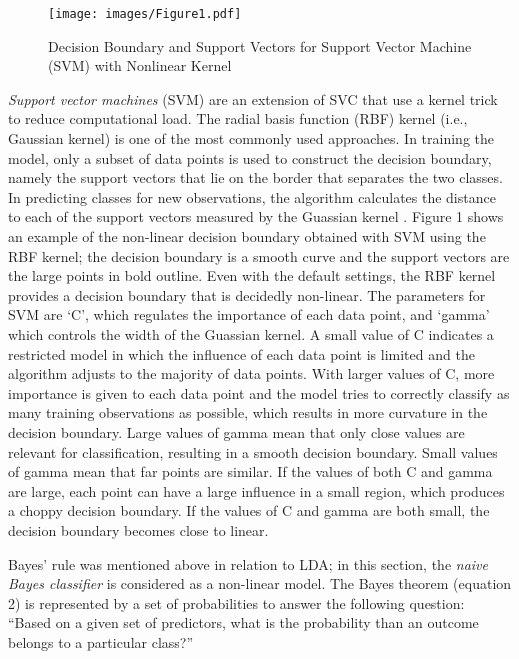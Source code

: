 \documentclass[sigconf]{acmart}
\begin{document}
\begin{figure}[!ht]
  \centering\texttt{[image: images/Figure1.pdf]}
  \caption{Decision Boundary and Support Vectors for Support Vector Machine 
  (SVM) with Nonlinear Kernel \cite{muller17}}
  \label{f:Figure1}
\end{figure}


\emph{Support vector machines} (SVM) are an extension of SVC that use a 
kernel trick to reduce computational load. The radial basis function (RBF) 
kernel (i.e., Gaussian kernel) is one of the most commonly used approaches. 
In training the model, only a subset of data points is used to construct the 
decision boundary, namely the support vectors that lie on the border that 
separates the two classes. In predicting classes for new observations, the 
algorithm calculates the distance to each of the support vectors measured 
by the Guassian kernel \cite{muller17}. Figure 1 shows an example of the 
non-linear decision boundary obtained with SVM using the RBF kernel; the 
decision boundary is a smooth curve and the support vectors are the large 
points in bold outline. Even with the default settings, the RBF kernel 
provides a decision boundary that is decidedly non-linear. The parameters 
for SVM are `C', which regulates the importance of each data point, and 
`gamma' which controls the width of the Guassian kernel. A small value of 
C indicates a restricted model in which the influence of each data point is 
limited and the algorithm adjusts to the majority of data points. With larger 
values of C, more importance is given to each data point and the model tries 
to correctly classify as many training observations as possible, which results 
in more curvature in the decision boundary. Large values of gamma mean that 
only close values are relevant for classification, resulting in a smooth 
decision boundary. Small values of gamma mean that far points are similar. 
If the values of both C and gamma are large, each point can have a large 
influence in a small region, which produces a choppy decision boundary. 
If the values of C and gamma are both small, the decision boundary becomes 
close to linear.


Bayes' rule was mentioned above in relation to LDA; in this section, the 
\emph{naive Bayes classifier} is considered as a non-linear model.
The Bayes theorem (equation 2) is represented by a set of probabilities 
to answer the following question: ``Based on a given set of predictors, 
what is the probability than an outcome belongs to a particular class?''
\end{document}
